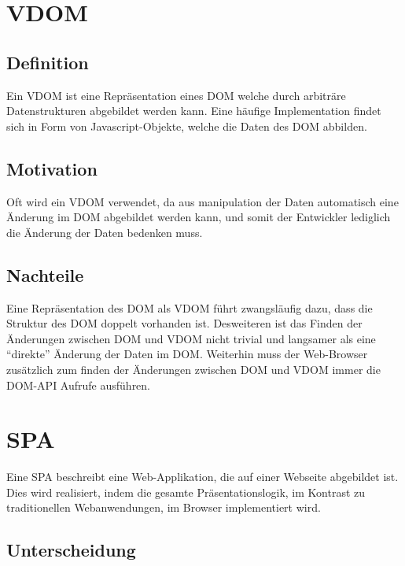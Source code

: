 \section{\acl{VDOM}}
\subsection{Definition}

Ein \ac{VDOM} ist eine Repräsentation eines \ac{DOM} welche durch arbiträre
Datenstrukturen abgebildet werden kann. Eine häufige Implementation findet sich
in Form von Javascript-Objekte, welche die Daten des \ac{DOM} abbilden.

\subsection{Motivation}

Oft wird ein \ac{VDOM} verwendet, da aus manipulation der Daten automatisch eine
Änderung im \ac{DOM} abgebildet werden kann, und somit der Entwickler lediglich
die Änderung der Daten bedenken muss.

\subsection{Nachteile}

Eine Repräsentation des \ac{DOM} als \ac{VDOM} führt zwangsläufig dazu, dass die
Struktur des \ac{DOM} doppelt vorhanden ist. Desweiteren ist das Finden der
Änderungen zwischen \ac{DOM} und \ac{VDOM} nicht trivial und langsamer als eine
``direkte'' Änderung der Daten im \ac{DOM}. Weiterhin muss der Web-Browser
zusätzlich zum finden der Änderungen zwischen \ac{DOM} und \ac{VDOM} immer
die \ac{DOM}-\ac{API} Aufrufe ausführen.

\section{\acl{SPA}}
Eine \ac{SPA} beschreibt eine Web-Applikation, die auf einer Webseite abgebildet ist. Dies wird realisiert, indem die gesamte Präsentationslogik, im Kontrast zu traditionellen Webanwendungen, im Browser implementiert wird.\cite{SPA} 
\subsection{Unterscheidung}
